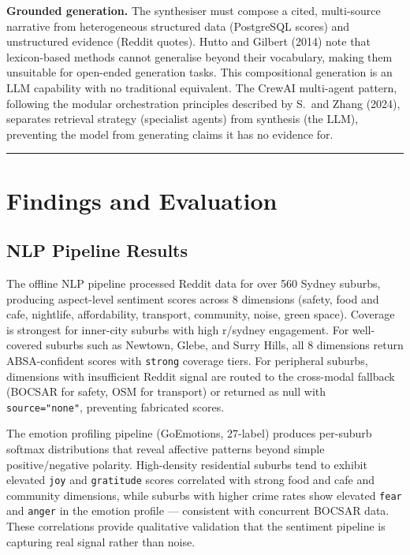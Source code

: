 \documentclass[11pt,a4paper]{article}
\newcounter{none}
\newcommand{\passthrough}[1]{#1}
\begin{document}
\textbf{Grounded generation.} The synthesiser must compose a cited, multi-source narrative from heterogeneous structured data (PostgreSQL scores) and unstructured evidence (Reddit quotes). Hutto and Gilbert (2014) note that lexicon-based methods cannot generalise beyond their vocabulary, making them unsuitable for open-ended generation tasks. This compositional generation is an LLM capability with no traditional equivalent. The CrewAI multi-agent pattern, following the modular orchestration principles described by S.\ and Zhang (2024), separates retrieval strategy (specialist agents) from synthesis (the LLM), preventing the model from generating claims it has no evidence for.

\begin{center}\rule{0.5\linewidth}{0.5pt}\end{center}

\section{Findings and Evaluation}\label{6-findings-and-evaluation}

\subsection{NLP Pipeline Results}\label{61-nlp-pipeline-results}

The offline NLP pipeline processed Reddit data for over 560 Sydney suburbs, producing aspect-level sentiment scores across 8 dimensions (safety, food and cafe, nightlife, affordability, transport, community, noise, green space). Coverage is strongest for inner-city suburbs with high r/sydney engagement. For well-covered suburbs such as Newtown, Glebe, and Surry Hills, all 8 dimensions return ABSA-confident scores with \passthrough{\lstinline!strong!} coverage tiers. For peripheral suburbs, dimensions with insufficient Reddit signal are routed to the cross-modal fallback (BOCSAR for safety, OSM for transport) or returned as null with \passthrough{\lstinline!source="none"!}, preventing fabricated scores.

The emotion profiling pipeline (GoEmotions, 27-label) produces per-suburb softmax distributions that reveal affective patterns beyond simple positive/negative polarity. High-density residential suburbs tend to exhibit elevated \passthrough{\lstinline!joy!} and \passthrough{\lstinline!gratitude!} scores correlated with strong food and cafe and community dimensions, while suburbs with higher crime rates show elevated \passthrough{\lstinline!fear!} and \passthrough{\lstinline!anger!} in the emotion profile --- consistent with concurrent BOCSAR data. These correlations provide qualitative validation that the sentiment pipeline is capturing real signal rather than noise.
\end{document}
